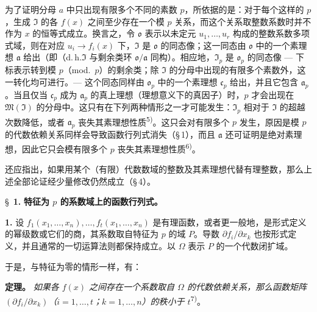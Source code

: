 \documentclass[11pt]{article}
\begin{document}
为了证明分母 $a$ 中只出现有限多个不同的素数 $p$，所依据的是：对于每个这样的 $p$，生成 $\mathfrak{I}$ 的各 $f(x)$ 之间至少存在一个模 $p$ 关系，而这个关系取整数系数时并不作为 $x$ 的恒等式成立。换言之，令 $\mathfrak{o}$ 表示以未定元 $u_1,\ldots,u_r$ 构成的整数系数多项式域，则在对应 $u_i \to f_i(x)$ 下，$\mathfrak{I}$ 是 $\mathfrak{o}$ 的同态像；这一同态由 $\mathfrak{o}$ 中的一个素理想 $\mathfrak{a}$ 给出（即（d.\,h.\）$\mathfrak{I}$ 与剩余类环 $\mathfrak{o}/\mathfrak{a}$ 同构）。相应地，$\mathfrak{I}_p$ 是 $\mathfrak{o}_p$ 的同态像 --- 下标表示转到模 $p$（mod.\ $p$）的剩余类；除 $\mathfrak{I}$ 的分母中出现的有限多个素数外，这一转化均可进行。--- 这个同态同样由 $\mathfrak{o}_p$ 中的一个素理想 $\mathfrak{c}_p$ 给出，并且它包含 $\mathfrak{a}_p$。当且仅当 $\mathfrak{c}_p$ 成为 $\mathfrak{a}_p$ 的真上理想（理想意义下的真因子）时，$p$ 才会出现在 $\mathfrak{M}(\mathfrak{I})$ 的分母中。这只有在下列两种情形之一才可能发生：$\mathfrak{I}_p$ 相对于 $\mathfrak{I}$ 的超越次数降低，或者 $\mathfrak{a}_p$ 丧失其素理想性质\textsuperscript{5)}。这只会对有限多个 $p$ 发生，原因是模 $p$ 的代数依赖关系同样会导致函数行列式消失（\S\,1），而且 $\mathfrak{a}$ 还可证明是绝对素理想，因此它只会模有限多个 $p$ 丧失其素理想性质\textsuperscript{6)}。

还应指出，如果用某个（有限）代数数域的整数及其素理想代替有理整数，那么上述全部论证经少量修改仍然成立（\S\,4）。

\bigskip
\S~\textbf{1.}
\textbf{特征为 $p$ 的系数域上的函数行列式。}

\smallskip

\noindent\textbf{1.}
设 $f_1(x_1,\ldots,x_n),\ldots,f_t(x_1,\ldots,x_n)$ 是有理函数，或者更一般地，是形式定义的幂级数或它们的商，其系数取自特征为 $p$ 的域 $P$。导数 $\partial f_i/\partial x_k$ 也按形式定义，并且通常的一切运算法则都保持成立。以 $\Omega$ 表示 $P$ 的一个代数闭扩域。

于是，与特征为零的情形一样，有：

\noindent\textbf{定理。}
\textit{如果各 $f(x)$ 之间存在一个系数取自 $\Omega$ 的代数依赖关系，那么函数矩阵 $(\partial f_i/\partial x_k)$（$i=1,\ldots,t$；$k=1,\ldots,n$）的秩小于 $t$}\textsuperscript{7)}。
\end{document}
